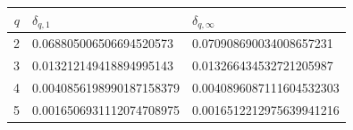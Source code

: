 \begin{tabular}{rll}
\toprule
$q$ & $\delta_{q,1}$ & $\delta_{q,\infty}$\\
\midrule
2 & 0.068805006506694520573 & 0.070908690034008657231\\
3 & 0.013212149418894995143 & 0.013266434532721205987\\
4 & 0.0040856198990187158379 & 0.0040896087111604532303\\
5 & 0.0016506931112074708975 & 0.0016512212975639941216\\
\bottomrule
\end{tabular}
